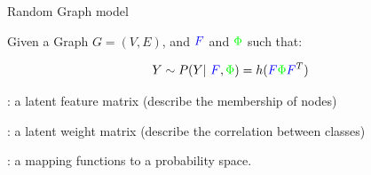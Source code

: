 \begin{frame}[t]{Random Graph model}

Given a Graph $G=(V,E)$, and $\textcolor{blue}{F}$ and $\textcolor{green}{\Phi}$ such that:

\begin{equation*}
    Y \sim P(Y | \textcolor{blue}{F}, \textcolor{green}{\Phi}) =h( \textcolor{blue}{F}\textcolor{green}{\Phi} \textcolor{blue}{F}^T )
\end{equation*}


\begin{description}
\setlength{\itemindent}{-2cm}
\item[\textcolor{blue}{$F$}]: a latent feature matrix (describe the membership of nodes)
\item[\textcolor{green}{$\Phi$}]: a latent weight matrix (describe the correlation between classes)
\item[$h$]: a mapping functions to a probability space.
\end{description}

\pause


    \begin{columns}
        \begin{column}{0.6\textwidth}
            


\end{column}
\end{columns}
\end{frame}
